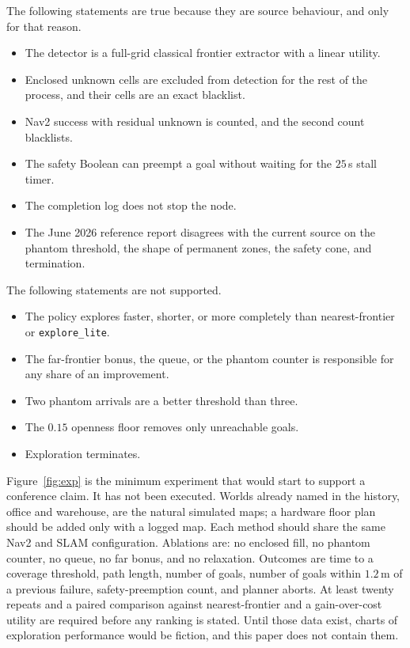 \documentclass[11pt]{article}
\begin{document}
The following statements are true because they are source behaviour, and only for that reason.
\begin{itemize}
\item The detector is a full-grid classical frontier extractor with a linear utility.
\item Enclosed unknown cells are excluded from detection for the rest of the process, and their cells are an exact blacklist.
\item Nav2 success with residual unknown is counted, and the second count blacklists.
\item The safety Boolean can preempt a goal without waiting for the $25$\,s stall timer.
\item The completion log does not stop the node.
\item The June 2026 reference report disagrees with the current source on the phantom threshold, the shape of permanent zones, the safety cone, and termination.
\end{itemize}
The following statements are not supported.
\begin{itemize}
\item The policy explores faster, shorter, or more completely than nearest-frontier or \texttt{explore\_lite}.
\item The far-frontier bonus, the queue, or the phantom counter is responsible for any share of an improvement.
\item Two phantom arrivals are a better threshold than three.
\item The $0.15$ openness floor removes only unreachable goals.
\item Exploration terminates.
\end{itemize}

Figure~\ref{fig:exp} is the minimum experiment that would start to support a conference claim. It has not been executed. Worlds already named in the history, office and warehouse, are the natural simulated maps; a hardware floor plan should be added only with a logged map. Each method should share the same Nav2 and SLAM configuration. Ablations are: no enclosed fill, no phantom counter, no queue, no far bonus, and no relaxation. Outcomes are time to a coverage threshold, path length, number of goals, number of goals within $1.2$\,m of a previous failure, safety-preemption count, and planner aborts. At least twenty repeats and a paired comparison against nearest-frontier and a gain-over-cost utility are required before any ranking is stated. Until those data exist, charts of exploration performance would be fiction, and this paper does not contain them.
\end{document}
